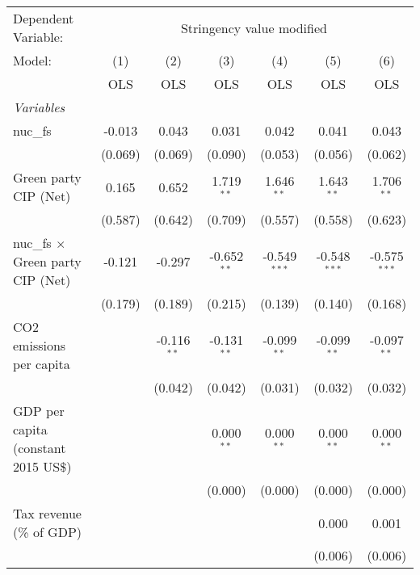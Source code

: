 
\begingroup
\centering
\begin{tabular}{lcccccc}
   \toprule
   Dependent Variable: & \multicolumn{6}{c}{Stringency value modified}\\
   Model:                                   & (1)     & (2)           & (3)           & (4)            & (5)            & (6)\\  
                                            &  OLS    & OLS           & OLS           & OLS            & OLS            & OLS\\  
   \midrule
   \emph{Variables}\\
   nuc\_fs                                  & -0.013  & 0.043         & 0.031         & 0.042          & 0.041          & 0.043\\   
                                            & (0.069) & (0.069)       & (0.090)       & (0.053)        & (0.056)        & (0.062)\\   
   Green party CIP (Net)                    & 0.165   & 0.652         & 1.719$^{**}$  & 1.646$^{**}$   & 1.643$^{**}$   & 1.706$^{**}$\\   
                                            & (0.587) & (0.642)       & (0.709)       & (0.557)        & (0.558)        & (0.623)\\   
   nuc\_fs $\times$ Green party CIP (Net)   & -0.121  & -0.297        & -0.652$^{**}$ & -0.549$^{***}$ & -0.548$^{***}$ & -0.575$^{***}$\\   
                                            & (0.179) & (0.189)       & (0.215)       & (0.139)        & (0.140)        & (0.168)\\   
   CO2 emissions per capita                 &         & -0.116$^{**}$ & -0.131$^{**}$ & -0.099$^{**}$  & -0.099$^{**}$  & -0.097$^{**}$\\   
                                            &         & (0.042)       & (0.042)       & (0.031)        & (0.032)        & (0.032)\\   
   GDP per capita (constant 2015 US\$)      &         &               & 0.000$^{**}$  & 0.000$^{**}$   & 0.000$^{**}$   & 0.000$^{**}$\\   
                                            &         &               & (0.000)       & (0.000)        & (0.000)        & (0.000)\\   
   Tax revenue (\% of GDP)                  &         &               &               &                & 0.000          & 0.001\\   
                                            &         &               &               &                & (0.006)        & (0.006)\\   

\end{tabular}
